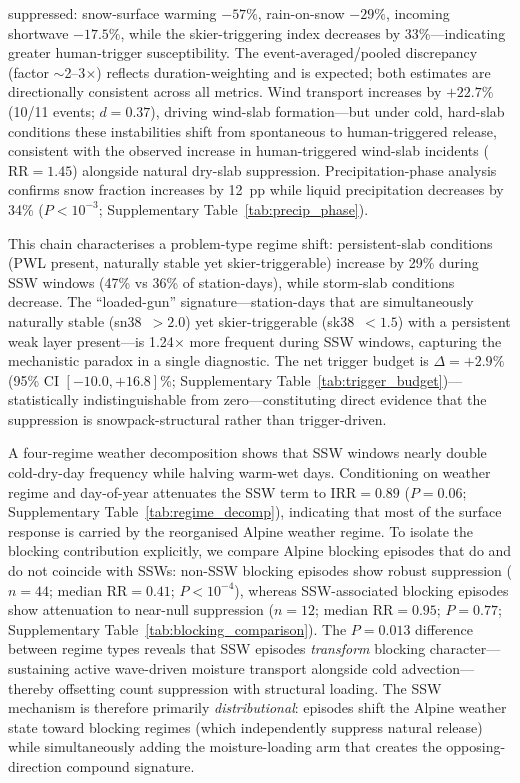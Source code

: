 \documentclass[11pt,letterpaper]{article}
\begin{document}
suppressed: snow-surface warming $-57\%$, rain-on-snow $-29\%$, incoming shortwave $-17.5\%$, while the skier-triggering index decreases by 33\%---indicating greater human-trigger susceptibility. The event-averaged/pooled discrepancy (factor $\sim$2--3$\times$) reflects duration-weighting and is expected; both estimates are directionally consistent across all metrics. Wind transport increases by $+22.7\%$ (10/11 events; $d = 0.37$), driving wind-slab formation---but under cold, hard-slab conditions these instabilities shift from spontaneous to human-triggered release\cite{McClung2006}, consistent with the observed increase in human-triggered wind-slab incidents ($\mathrm{RR} = 1.45$) alongside natural dry-slab suppression. Precipitation-phase analysis confirms snow fraction increases by 12~pp while liquid precipitation decreases by 34\% ($P < 10^{-3}$; Supplementary Table~\ref{tab:precip_phase}).

This chain characterises a problem-type regime shift: persistent-slab conditions (PWL present, naturally stable yet skier-triggerable) increase by 29\% during SSW windows (47\% vs 36\% of station-days), while storm-slab conditions decrease. The ``loaded-gun'' signature---station-days that are simultaneously naturally stable (sn38~$> 2.0$) yet skier-triggerable (sk38~$< 1.5$) with a persistent weak layer present---is 1.24$\times$ more frequent during SSW windows, capturing the mechanistic paradox in a single diagnostic. The net trigger budget is $\Delta = +2.9\%$ (95\% CI $[-10.0, +16.8]$\%; Supplementary Table~\ref{tab:trigger_budget})---statistically indistinguishable from zero---constituting direct evidence that the suppression is snowpack-structural rather than trigger-driven.

A four-regime weather decomposition shows that SSW windows nearly double cold-dry-day frequency while halving warm-wet days. Conditioning on weather regime and day-of-year attenuates the SSW term to $\mathrm{IRR} = 0.89$ ($P = 0.06$; Supplementary Table~\ref{tab:regime_decomp}), indicating that most of the surface response is carried by the reorganised Alpine weather regime. To isolate the blocking contribution explicitly, we compare Alpine blocking episodes that do and do not coincide with SSWs: non-SSW blocking episodes show robust suppression ($n = 44$; median $\mathrm{RR} = 0.41$; $P < 10^{-4}$), whereas SSW-associated blocking episodes show attenuation to near-null suppression ($n = 12$; median $\mathrm{RR} = 0.95$; $P = 0.77$; Supplementary Table~\ref{tab:blocking_comparison}). The $P = 0.013$ difference between regime types reveals that SSW episodes \emph{transform} blocking character---sustaining active wave-driven moisture transport alongside cold advection---thereby offsetting count suppression with structural loading. The SSW mechanism is therefore primarily \emph{distributional}: episodes shift the Alpine weather state toward blocking regimes (which independently suppress natural release) while simultaneously adding the moisture-loading arm that creates the opposing-direction compound signature.
\end{document}
